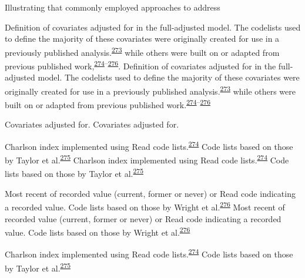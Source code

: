 \documentclass[a4paper, twoside]{templates/ociamthesis}
\begin{document}
Illustrating that commonly employed approaches to address

Definition of covariates adjusted for in the full-adjusted model. The codelists used to define the majority of these covariates were originally created for use in a previously published analysis.\textsuperscript{\protect\hyperlink{ref-walker2020}{273}} while others were built on or adapted from previous published work,\textsuperscript{\protect\hyperlink{ref-khan2010}{274}--\protect\hyperlink{ref-wright2017}{276}}. Definition of covariates adjusted for in the full-adjusted model. The codelists used to define the majority of these covariates were originally created for use in a previously published analysis.\textsuperscript{\protect\hyperlink{ref-walker2020}{273}} while others were built on or adapted from previous published work.\textsuperscript{\protect\hyperlink{ref-khan2010}{274}--\protect\hyperlink{ref-wright2017}{276}}

Covariates adjusted for. Covariates adjusted for.

Charlson index implemented using Read code lists.\textsuperscript{\protect\hyperlink{ref-khan2010}{274}} Code lists based on those by Taylor et al.\textsuperscript{\protect\hyperlink{ref-taylor2016}{275}} Charlson index implemented using Read code lists.\textsuperscript{\protect\hyperlink{ref-khan2010}{274}} Code lists based on those by Taylor et al.\textsuperscript{\protect\hyperlink{ref-taylor2016}{275}}

Most recent of recorded value (current, former or never) or Read code indicating a recorded value. Code lists based on those by Wright et al.\textsuperscript{\protect\hyperlink{ref-wright2017}{276}} Most recent of recorded value (current, former or never) or Read code indicating a recorded value. Code lists based on those by Wright et al.\textsuperscript{\protect\hyperlink{ref-wright2017}{276}}

Charlson index implemented using Read code lists.\textsuperscript{\protect\hyperlink{ref-khan2010}{274}} Code lists based on those by Taylor et al.\textsuperscript{\protect\hyperlink{ref-taylor2016}{275}}
\end{document}
